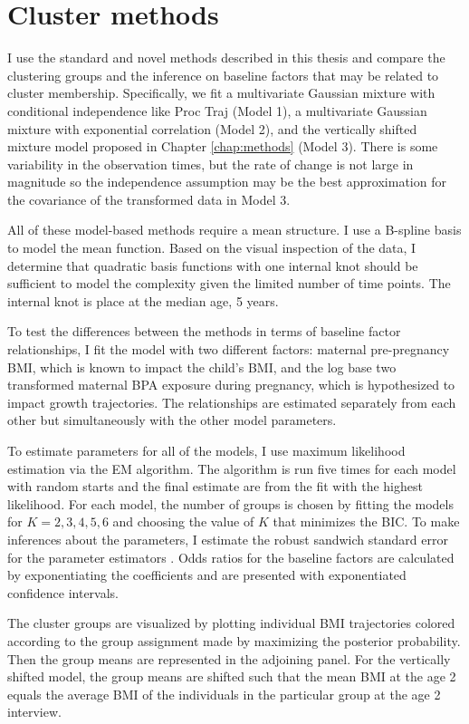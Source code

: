 \section{Cluster methods}
I use the standard and novel methods described in this thesis and compare the clustering groups and the inference on baseline factors that may be related to cluster membership. Specifically, we fit a multivariate Gaussian mixture with conditional independence like Proc Traj (Model 1), a multivariate Gaussian mixture with exponential correlation (Model 2), and the vertically shifted mixture model proposed in Chapter \ref{chap:methods} (Model 3). There is some variability in the observation times, but the rate of change is not large in magnitude so the independence assumption may be the best approximation for the covariance of the transformed data in Model 3.

All of these model-based methods require a mean structure. I use a B-spline basis to model the mean function. Based on the visual inspection of the data, I determine that quadratic basis functions with one internal knot should be sufficient to model the complexity given the limited number of time points.  The internal knot is place at the median age, 5 years. 

To test the differences between the methods in terms of baseline factor relationships, I fit the model with two different factors: maternal pre-pregnancy BMI, which is known to impact the child's BMI, and the log base two transformed maternal BPA exposure during pregnancy, which is hypothesized to impact growth trajectories. The relationships are estimated separately from each other but simultaneously with the other model parameters.

To estimate parameters for all of the models, I use maximum likelihood estimation via the EM algorithm. The algorithm is run five times for each model with random starts and the final estimate are from the fit with the highest likelihood. For each model, the number of groups is chosen by fitting the models for $K=2,3,4,5,6$ and choosing the value of $K$ that minimizes the BIC. To make inferences about the parameters, I estimate the robust sandwich standard error for the parameter estimators \cite{white1982}. Odds ratios for the baseline factors are calculated by exponentiating the coefficients and are presented with exponentiated confidence intervals.

The cluster groups are visualized by plotting individual BMI trajectories colored according to the group assignment made by maximizing the posterior probability. Then the group means are represented in the adjoining panel. For the vertically shifted model, the group means are shifted such that the mean BMI at the age 2 equals the average BMI of the individuals in the particular group at the age 2 interview. 

